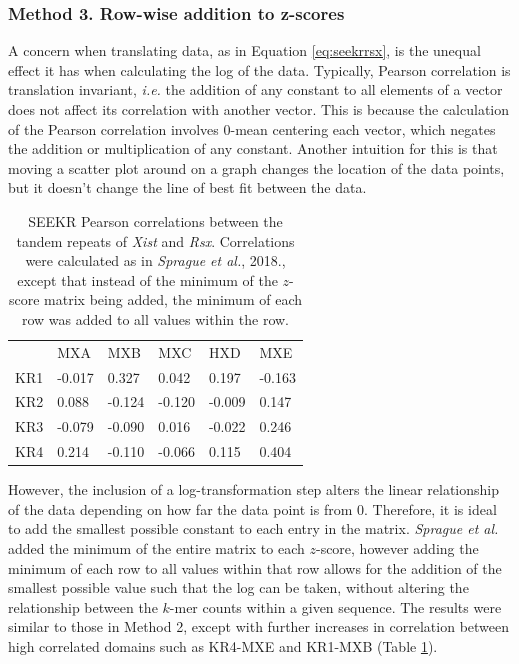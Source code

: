 \subsubsection{Method 3. Row-wise addition to z-scores}

A concern when translating data, as in Equation \ref{eq:seekrrsx}, is the unequal effect it has when calculating the log of the data. Typically, Pearson correlation is translation invariant, \emph{i.e.} the addition of any constant to all elements of a vector does not affect its correlation with another vector. This is because the calculation of the Pearson correlation involves 0-mean centering each vector, which negates the addition or multiplication of any constant. Another intuition for this is that moving a scatter plot around on a graph changes the location of the data points, but it doesn't change the line of best fit between the data. 

\begin{table}[ht]
\begin{center}
\begin{tabular}{llllll}
&MXA & MXB                   & MXC                  & HXD                  & MXE                                  \\
KR1 & -0.017 & 0.327   & 0.042  & 0.197    & -0.163 \\
KR2 & 0.088   & -0.124 & -0.120 & -0.009 & 0.147 \\
KR3 & -0.079  & -0.090 & 0.016 & -0.022 & 0.246 \\
KR4 & 0.214    & -0.110 & -0.066  & 0.115   & 0.404
\end{tabular}
\caption[Row-wise minimum addition to $z$-score]{SEEKR Pearson correlations between the tandem repeats of \emph{Xist} and \emph{Rsx}. Correlations were calculated as in \emph{Sprague et al.}, 2018., except that instead of the minimum of the $z$-score matrix being added, the minimum of each row was added to all values within the row.}
\label{tbl:kmers3}
\end{center}
\end{table}

However, the inclusion of a log-transformation step alters the linear relationship of the data depending on how far the data point is from 0. Therefore, it is ideal to add the smallest possible constant to each entry in the matrix. \emph{Sprague et al.} added the minimum of the entire matrix to each $z$-score, however adding the minimum of each row to all values within that row allows for the addition of the smallest possible value such that the log can be taken, without altering the relationship between the $k$-mer counts within a given sequence. The results were similar to those in Method 2, except with further increases in correlation between high correlated domains such as KR4-MXE and KR1-MXB (Table \ref{tbl:kmers3}). 

